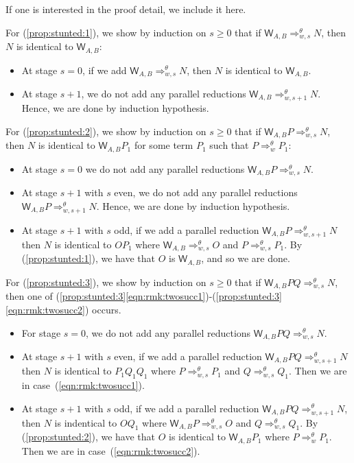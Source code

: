 \documentclass{lmcs} %
\newcommand{\param}{\theta}
\newcommand{\Reduces}[2]{\Rightarrow_{#1}^{#2}}
\newcommand{\ctW}[4]{{\mathsf W}_{#1, #2}#3#4}
\begin{document}
\begin{proofdetail}
If one is interested in the proof detail, we include it here. 

For (\ref{prop:stunted:1}), we show by induction on $s\geq 0$ that if $\ctW{A}{B}{}{} \Reduces{w,s}{\param} N$, then $N$ is identical to $\ctW{A}{B}{}{}$:
\begin{itemize}[leftmargin=*]
    \item At stage $s=0$, if we add $\ctW{A}{B}{}{} \Reduces{w,s}{\param} N$, then  $N$ is identical to $\ctW{A}{B}{}{}$.
    \item At stage $s+1$, we do not add any parallel reductions  $\ctW{A}{B}{}{} \Reduces{w,s+1}{\param} N$. Hence, we are done by induction hypothesis.
\end{itemize}

For (\ref{prop:stunted:2}), we show by induction on $s\geq 0$ that if $\ctW{A}{B}{P}{} \Reduces{w,s}{\param} N$, then $N$ is identical to $\ctW{A}{B}{P_1}{}$ for some term $P_1$ such that $P\Reduces{w}{\param} P_1$:
\begin{itemize}[leftmargin=*]
    \item At stage $s=0$ we do not add any parallel reductions  $\ctW{A}{B}{P}{} \Reduces{w,s}{\param} N$.
    \item At stage $s+1$ with $s$ even, we do not add any parallel reductions  $\ctW{A}{B}{P}{} \Reduces{w,s+1}{\param} N$. Hence, we are done by induction hypothesis.
    \item At stage $s+1$ with $s$ odd, if we add a parallel reduction  $\ctW{A}{B}{P}{} \Reduces{w,s+1}{\param} N$ then $N$ is identical to $OP_1$ where $\ctW{A}{B}{}{} \Reduces{w,s}{\param} O$ and $P\Reduces{w,s}{\param} P_1$. By (\ref{prop:stunted:1}), we have that $O$ is $\ctW{A}{B}{}{}$, and so we are done.
\end{itemize}

For (\ref{prop:stunted:3}), we show by induction on $s\geq 0$ that if $\ctW{A}{B}{P}{Q}\Reduces{w,s}{\param} N$, then one of (\ref{prop:stunted:3}\ref{eqn:rmk:twosucc1})-(\ref{prop:stunted:3}\ref{eqn:rmk:twosucc2}) occurs.
\begin{itemize}[leftmargin=*]
    \item For stage $s=0$, we do not add any parallel reductions $\ctW{A}{B}{P}{Q}\Reduces{w,s}{\param} N$.
    \item At stage $s+1$ with $s$ even, if we add a parallel reduction $\ctW{A}{B}{P}{Q} \Reduces{w,s+1}{\param} N$ then $N$ is identical to $P_1Q_1Q_1$ where $P\Reduces{w,s}{\param} P_1$ and $Q\Reduces{w,s}{\param} Q_1$. Then we are in case~(\ref{eqn:rmk:twosucc1}).
    \item At stage $s+1$ with $s$ odd, if we add a parallel reduction  $\ctW{A}{B}{P}{Q} \Reduces{w,s+1}{\param} N$, then $N$ is indentical to $OQ_1$ where  $\ctW{A}{B}{P}{} \Reduces{w,s}{\param} O$ and $Q\Reduces{w,s}{\param} Q_1$. By (\ref{prop:stunted:2}), we have that $O$ is identical to $\ctW{A}{B}{P_1}{}$ where $P\Reduces{w}{\param} P_1$. Then we are in case~(\ref{eqn:rmk:twosucc2}).
\end{itemize}

\end{proofdetail}
\end{document}
